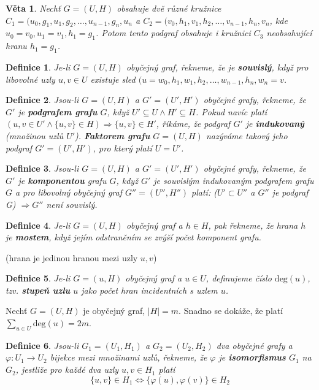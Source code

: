 \documentclass[a4paper, 11pt]{report}
\newtheorem{mydef}{Definice}[chapter]
\newtheorem{veta}{Věta}[chapter]
\begin{document}
\begin{veta}
Nechť $G=(U, H)$ obsahuje dvě různé kružnice
$C_1 = (u_0, g_1, u_1, g_2, \dots, u_{n-1}, g_n, u_n$ a
$C_2 = (v_0, h_1, v_1, h_2, \dots, v_{n-1}, h_n, v_n$,
kde $u_0 = v_0, u_1 = v_1, h_1 = g_1$. Potom tento podgraf obsahuje i kružnici $C_3$ neobsahující hranu $h_1 = g_1$.
\end{veta}

\begin{mydef}
Je-li $G=(U, H)$ obyčejný graf, řekneme, že je \textbf{souvislý}, když pro libovolné uzly $u, v \in U$ existuje sled $(u=w_0, h_1, w_1, h_2, \dots, w_{n-1}, h_n, w_n = v$.
\end{mydef}

\begin{mydef}
Jsou-li $G=(U, H)$ a $G'=(U', H')$ obyčejné grafy, řekneme, že $G'$ je \textbf{podgrafem grafu} $G$, když $U' \subseteq U \land H' \subseteq H$. Pokud navíc platí $(u, v \in U' \land \{u, v \} \in H) \Rightarrow \{u, v\} \in H'$, říkáme, že podgraf $G'$ je \textbf{indukovaný} (množinou uzlů $U'$). \textbf{Faktorem grafu} $G=(U, H)$ nazýváme takový jeho podgraf $G'=(U', H')$, pro který platí $U=U'$. 
\end{mydef}

\begin{mydef}
Jsou-li $G=(U, H)$ a $G'=(U', H')$ obyčejné grafy, řekneme, že $G'$ je \textbf{komponentou} grafu $G$, když $G'$ je souvislým indukovaným podgrafem grafu $G$ a pro libovolný obyčejný graf $G''=(U'', H'')$ platí: ($U' \subset U''$ a $G''$ je podgraf G) $\Rightarrow G''$ není souvislý.
\end{mydef}

\begin{mydef}
Je-li $G=(U, H)$ obyčejný graf a $h \in H$, pak řekneme, že hrana $h$ je \textbf{mostem}, když jejím odstraněním se zvýší počet komponent grafu.
\end{mydef}
(hrana je jedinou hranou mezi uzly $u, v$)

\begin{mydef}
Je-li $G = (u, H)$ obyčejný graf a $u \in U$, definujeme číslo $\text{deg}(u)$, tzv. \textbf{stupeň uzlu} $u$ jako počet hran incidentních s uzlem $u$.
\end{mydef}
Nechť $G=(U, H)$ je obyčejný graf, $|H|=m$. Snadno se dokáže, že platí $\sum\limits_{u \in U} \text{deg}(u) = 2 m$.

\begin{mydef}
Jsou-li $G_1=(U_1, H_1)$ a $G_2=(U_2, H_2)$ dva obyčejné grafy a $\varphi: U_1 \to U_2$ bijekce mezi množinami uzlů, řekneme, že $\varphi$ je \textbf{isomorfismus} $G_1$ na $G_2$, jestliže pro každé dva uzly $u, v \in H_1$ platí
$$ \{u, v\} \in H_1 \Leftrightarrow \{\varphi(u), \varphi(v)\} \in H_2$$
\end{mydef}
\end{document}

